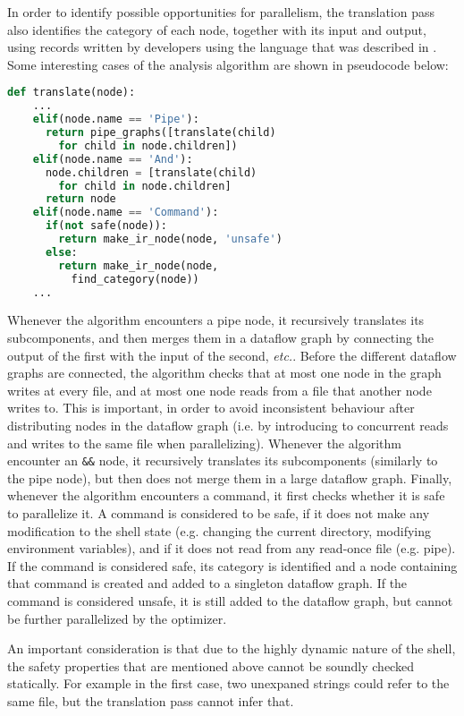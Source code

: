\documentclass[sigplan,10pt,review,anonymous]{acmart}
\newcommand{\etc}{{\em etc.}\xspace}
\newcommand{\ttt}[1]{\texttt{\small #1}}
\begin{document}
In order to identify possible opportunities for parallelism, the
translation pass also identifies the category of each node, together
with its input and output, using records written by developers using
the language that was described in . Some interesting cases
of the analysis algorithm are shown in pseudocode below:

\begin{lstlisting}[language=python, float=h]
  def translate(node):
    ...
    elif(node.name == 'Pipe'):
      return pipe_graphs([translate(child)
        for child in node.children])
    elif(node.name == 'And'):
      node.children = [translate(child)
        for child in node.children]
      return node
    elif(node.name == 'Command'):
      if(not safe(node)):
        return make_ir_node(node, 'unsafe')
      else:
        return make_ir_node(node,
          find_category(node))
    ...
\end{lstlisting}

Whenever the algorithm encounters a pipe node, it recursively
translates its subcomponents, and then merges them in a dataflow graph
by connecting the output of the first with the input of the second,
\etc. Before the different dataflow graphs are connected, the
algorithm checks that at most one node in the graph writes at every
file, and at most one node reads from a file that another node writes
to. This is important, in order to avoid inconsistent behaviour after
distributing nodes in the dataflow graph (i.e. by introducing to
concurrent reads and writes to the same file when
parallelizing). Whenever the algorithm encounter an \ttt{\&\&} node,
it recursively translates its subcomponents (similarly to the pipe
node), but then does not merge them in a large dataflow
graph. Finally, whenever the algorithm encounters a command, it first
checks whether it is safe to parallelize it. A command is considered
to be safe, if it does not make any modification to the shell state
(e.g. changing the current directory, modifying environment
variables), and if it does not read from any read-once file
(e.g. pipe). If the command is considered safe, its category is
identified and a node containing that command is created and added to
a singleton dataflow graph. If the command is considered unsafe, it is
still added to the dataflow graph, but cannot be further parallelized
by the optimizer.

An important consideration is that due to the highly dynamic nature of
the shell, the safety properties that are mentioned above cannot be
soundly checked statically. For example in the first case, two
unexpaned strings could refer to the same file, but the translation
pass cannot infer that.
\end{document}
